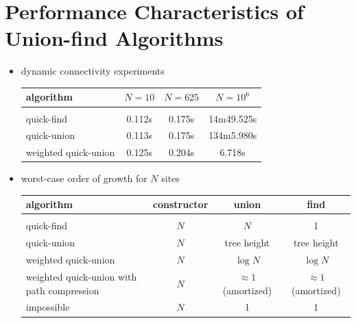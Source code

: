 \documentclass[8pt,a4paper,compress]{beamer}
\begin{document}
\section{Performance Characteristics of Union-find Algorithms}
\begin{frame}[fragile]
\begin{itemize}
\item dynamic connectivity experiments
\begin{center}
\begin{tabular}{p{3cm}ccc}
\centering \textbf{algorithm} & \textbf{$N=10$} & \textbf{$N=625$} & \textbf{$N=10^6$} \\ \hline \\
\centering quick-find & 0.112s & 0.175s & 14m49.525s \\
\centering quick-union & 0.113s & 0.175s & 134m5.980s \\
\centering weighted quick-union & 0.125s & 0.204s & 6.718s
\end{tabular} 
\end{center}

\item worst-case order of growth for $N$ sites
\begin{center}
\begin{tabular}{p{3cm}ccc}
\centering \textbf{algorithm} & \textbf{constructor} & \textbf{union} & \textbf{find} \\ \hline \\
\centering quick-find & $N$ & $N$ & 1 \\
\centering quick-union & $N$ & tree height & tree height \\
\centering weighted quick-union & $N$ & $\log N$ & $\log N$ \\
\centering weighted quick-union with path compression & $N$ & $\approx 1$ (amortized) & $\approx 1$ (amortized) \\
\centering impossible & $N$ & 1 & 1
\end{tabular} 
\end{center}
\end{itemize}
\end{frame}
\end{document}
